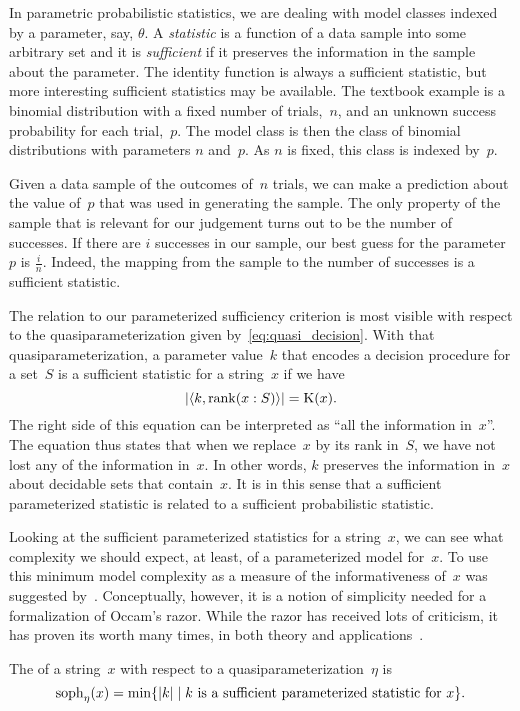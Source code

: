 \begin{example}
  In parametric probabilistic statistics, we are dealing with model classes indexed by a parameter, say, $\theta$.
  A \emph{statistic} is a function of a data sample into some arbitrary set and it is \emph{sufficient} if it preserves the information in the sample about the parameter.
  The identity function is always a sufficient statistic, but more interesting sufficient statistics may be available.
  The textbook example is a binomial distribution with a fixed number of trials,~$n$, and an unknown success probability for each trial,~$p$.
  The model class is then the class of binomial distributions with parameters $n$ and~$p$.
  As $n$ is fixed, this class is indexed by~$p$.

  Given a data sample of the outcomes of~$n$ trials, we can make a prediction about the value of~$p$ that was used in generating the sample.
  The only property of the sample that is relevant for our judgement turns out to be the number of successes.
  If there are $i$ successes in our sample, our best guess for the parameter~$p$ is $\frac{i}{n}$.
  Indeed, the mapping from the sample to the number of successes is a sufficient statistic.

  The relation to our parameterized sufficiency criterion is most visible with respect to the quasiparameterization given by~\eqref{eq:quasi_decision}.
  With that quasiparameterization, a parameter value~$k$ that encodes a decision procedure for a set~$S$ is a sufficient statistic for a string~$x$ if we have
  \begin{equation*}
    {\lvert{\langle k, \operatorname{rank}(x : S)\rangle}\rvert} = \operatorname{K}(x).
  \end{equation*}
  The right side of this equation can be interpreted as \enquote{all the information in~$x$}.
  The equation thus states that when we replace~$x$ by its rank in~$S$, we have not lost any of the information in~$x$.
  In other words, $k$ preserves the information in~$x$ about decidable sets that contain~$x$.
  It is in this sense that a sufficient parameterized statistic is related to a sufficient probabilistic statistic.
\end{example}

Looking at the sufficient parameterized statistics for a string~$x$, we can see what complexity we should expect, at least, of a parameterized model for~$x$.
To use this minimum model complexity as a measure of the informativeness of~$x$ was suggested by~\textcite{koppel1988structure}.
Conceptually, however, it is a notion of simplicity needed for a formalization of Occam's razor.
While the razor has received lots of criticism, it has proven its worth many times, in both theory and applications~\parencite{grunwald2007minimum}.
\begin{definition}
  The  of a string~$x$ with respect to a quasiparameterization~$\eta$ is
  \begin{equation*}
    \operatorname{soph}_\eta(x) = \min\{{\lvert k\rvert} \;|\; \text{$k$ is a sufficient parameterized statistic for $x$}\}.
  \end{equation*}
\end{definition}

